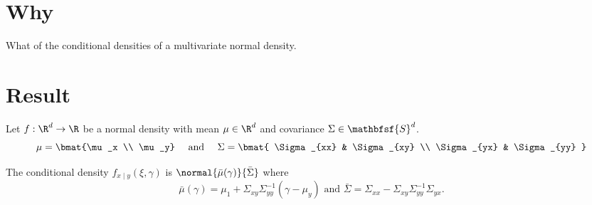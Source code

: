 
\section*{Why}

What of the conditional densities of a multivariate normal density.

\section*{Result}

\begin{proposition}
Let $f: \R ^d \to \R $ be a normal density with mean $\mu \in \R ^d$ and covariance $\Sigma  \in \mathbfsf{S} ^d$.
\[
\mu  = \bmat{\mu _x \\ \mu _y} \quad \text{ and } \quad
\Sigma  = \bmat{
\Sigma _{xx} & \Sigma _{xy} \\
\Sigma _{yx} & \Sigma _{yy}
}
\]

The conditional density $f_{x \mid y}(\xi , \gamma )$ is $\normal{\bar{\mu }(\gamma )}{\bar{\Sigma }}$ where
\[
\bar{\mu }(\gamma ) = \mu _1 + \Sigma _{xy}\Sigma _{yy}^{-1}(\gamma - \mu _y) \text{ and } \bar{\Sigma } = \Sigma _{xx} - \Sigma _{xy}\Sigma _{yy}^{-1}\Sigma _{yx}.
\]

\end{proposition}

\blankpage
